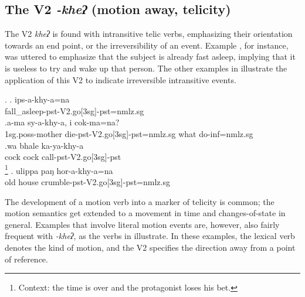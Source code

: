 \subsection{The V2 \emph{-kheʔ} (motion away, telicity)}\label{V2-go}%

The V2 \emph{kheʔ}  is  found with intransitive telic verbs, emphasizing their orientation towards an end point, or the irreversibility of an event. Example \Next[a], for instance, was uttered to emphasize that the subject is already fast asleep, implying that it is useless to try and wake up that person. The other examples in \Next illustrate the application of this V2 to indicate irreversible intransitive events.

\ex. \ag.  ips-a-khy-a=na\\
	  fall\_asleep{\sc -pst-V2.go[3sg]-pst=nmlz.sg}\\
\bg.a-ma sy-a-khy-a,                    i    cok-ma=na?\\
{\sc 1sg.poss-}mother die{\sc -pst-V2.go[3sg]-pst=nmlz.sg} what do{\sc -inf=nmlz.sg}\\
\bg.wa   bhale ka-ya-khy-a\\
cock cock call{\sc -pst-V2.go[3sg]-pst}\\
\footnote{Context: the time is over and the protagonist loses his bet.} 
\bg. ulippa paŋ hor-a-khy-a=na\\
	old house crumble{\sc -pst-V2.go[3sg]-pst=nmlz.sg}\\


The development of a motion verb into a marker of telicity is common; the motion semantics get extended to a movement in time and changes-of-state in general. Examples that involve literal motion events are, however, also fairly frequent with \emph{-kheʔ}, as the verbs in \Next illustrate. In these examples, the lexical verb denotes the kind of motion, and the V2 specifies the direction away from a point of reference.

